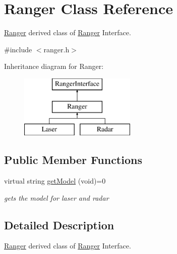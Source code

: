 \hypertarget{classRanger}{}\section{Ranger Class Reference}
\label{classRanger}


\hyperlink{classRanger}{Ranger} derived class of \hyperlink{classRanger}{Ranger} Interface.  




{\ttfamily \#include $<$ranger.\+h$>$}

Inheritance diagram for Ranger\+:\begin{figure}[H]
\begin{center}
\leavevmode
\includegraphics[height=3.000000cm]{classRanger}
\end{center}
\end{figure}
\subsection*{Public Member Functions}
\begin{DoxyCompactItemize}
\item 
virtual string \hyperlink{classRanger_aeac655d8f4543a8fc7218de555882fd4}{get\+Model} (void)=0\hypertarget{classRanger_aeac655d8f4543a8fc7218de555882fd4}{}\label{classRanger_aeac655d8f4543a8fc7218de555882fd4}

\begin{DoxyCompactList}\small\item\em gets the model for laser and radar \end{DoxyCompactList}\end{DoxyCompactItemize}


\subsection{Detailed Description}
\hyperlink{classRanger}{Ranger} derived class of \hyperlink{classRanger}{Ranger} Interface. 

